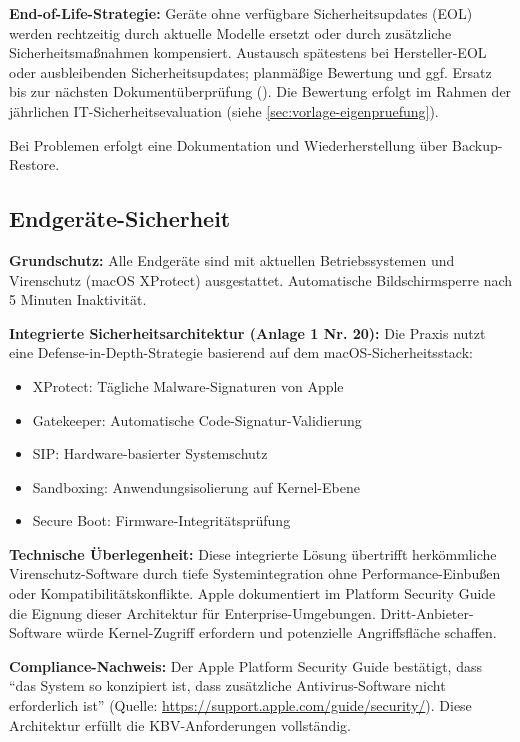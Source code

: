 \textbf{End-of-Life-Strategie:} Geräte ohne verfügbare Sicherheitsupdates (EOL) werden
rechtzeitig durch aktuelle Modelle ersetzt oder durch zusätzliche Sicherheitsmaßnahmen
kompensiert. Austausch spätestens bei Hersteller-EOL oder ausbleibenden
Sicherheitsupdates; planmäßige Bewertung und ggf. Ersatz bis zur nächsten
Dokumentüberprüfung (\NextReview). Die Bewertung erfolgt im Rahmen der jährlichen
IT-Sicherheitsevaluation (siehe \cref{sec:vorlage-eigenpruefung}).

\Dokumentation Bei Problemen erfolgt eine Dokumentation und Wiederherstellung
über Backup-Restore.

\subsection{Endgeräte-Sicherheit}
\label{sec:endgeraete}

\textbf{Grundschutz:} Alle Endgeräte sind mit aktuellen Betriebssystemen und Virenschutz
(macOS XProtect) ausgestattet. Automatische Bildschirmsperre nach 5 Minuten Inaktivität.

\textbf{Integrierte Sicherheitsarchitektur (Anlage 1 Nr. 20):} Die Praxis nutzt
eine Defense-in-Depth-Strategie basierend auf dem macOS-Sicherheitsstack:

\begin{itemize}
  \item XProtect: Tägliche Malware-Signaturen von Apple
  \item Gatekeeper: Automatische Code-Signatur-Validierung
  \item SIP: Hardware-basierter Systemschutz
  \item Sandboxing: Anwendungsisolierung auf Kernel-Ebene
  \item Secure Boot: Firmware-Integritätsprüfung
\end{itemize}

\textbf{Technische Überlegenheit:} Diese integrierte Lösung übertrifft herkömmliche
Virenschutz-Software durch tiefe Systemintegration ohne Performance-Einbußen oder
Kompatibilitätskonflikte. Apple dokumentiert im Platform Security Guide die
Eignung dieser Architektur für Enterprise-Umgebungen. Dritt-Anbieter-Software
würde Kernel-Zugriff erfordern und potenzielle Angriffsfläche schaffen.

\textbf{Compliance-Nachweis:} Der Apple Platform Security Guide bestätigt, dass
\enquote{das System so konzipiert ist, dass zusätzliche Antivirus-Software nicht
erforderlich ist} (Quelle: \url{https://support.apple.com/guide/security/}).
Diese Architektur erfüllt die KBV-Anforderungen vollständig.

